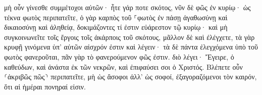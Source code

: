 \documentclass{openreader}
\begin{document}
μὴ οὖν γίνεσθε συμμέτοχοι αὐτῶν· 
ἦτε γάρ ποτε σκότος, νῦν δὲ φῶς ἐν κυρίῳ· ὡς τέκνα φωτὸς περιπατεῖτε, 
ὁ γὰρ καρπὸς τοῦ ⸀φωτὸς ἐν πάσῃ ἀγαθωσύνῃ καὶ δικαιοσύνῃ καὶ ἀληθείᾳ, 
δοκιμάζοντες τί ἐστιν εὐάρεστον τῷ κυρίῳ· 
καὶ μὴ συγκοινωνεῖτε τοῖς ἔργοις τοῖς ἀκάρποις τοῦ σκότους, μᾶλλον δὲ καὶ ἐλέγχετε, 
τὰ γὰρ κρυφῇ γινόμενα ὑπ’ αὐτῶν αἰσχρόν ἐστιν καὶ λέγειν· 
τὰ δὲ πάντα ἐλεγχόμενα ὑπὸ τοῦ φωτὸς φανεροῦται, 
πᾶν γὰρ τὸ φανερούμενον φῶς ἐστιν. διὸ λέγει· Ἔγειρε, ὁ καθεύδων, καὶ ἀνάστα ἐκ τῶν νεκρῶν, καὶ ἐπιφαύσει σοι ὁ Χριστός. 
Βλέπετε οὖν ⸂ἀκριβῶς πῶς⸃ περιπατεῖτε, μὴ ὡς ἄσοφοι ἀλλ’ ὡς σοφοί, 
ἐξαγοραζόμενοι τὸν καιρόν, ὅτι αἱ ἡμέραι πονηραί εἰσιν. 
\end{document}
